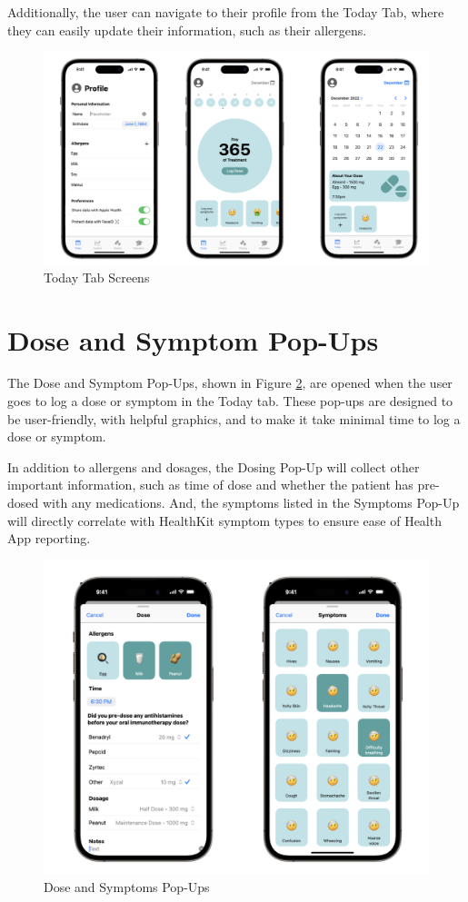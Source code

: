 Additionally, the user can navigate to their profile from the Today Tab, where they can easily update their information, such as their allergens.

\begin{figure}[H]
    \centering
    \includegraphics[width=.7\linewidth]{thesis//chapters//images/todayTabScreens.png}
    \caption{Today Tab Screens}
    \label{fig:today-tab-screens}
\end{figure}

\section{Dose and Symptom Pop-Ups}

The Dose and Symptom Pop-Ups, shown in Figure \ref{fig:dose-and-symptom-pop-ups}, are opened when the user goes to log a dose or symptom in the Today tab. These pop-ups are designed to be user-friendly, with helpful graphics, and to make it take minimal time to log a dose or symptom.

In addition to allergens and dosages, the Dosing Pop-Up will collect other important information, such as time of dose and whether the patient has pre-dosed with any medications. And, the symptoms listed in the Symptoms Pop-Up will directly correlate with HealthKit symptom types to ensure ease of Health App reporting.

\begin{figure}[H]
    \centering
    \includegraphics[width=0.5\linewidth]{thesis//chapters//images/doseAndSymptomPopUps.png}
    \caption{Dose and Symptoms Pop-Ups}
    \label{fig:dose-and-symptom-pop-ups}
\end{figure}

